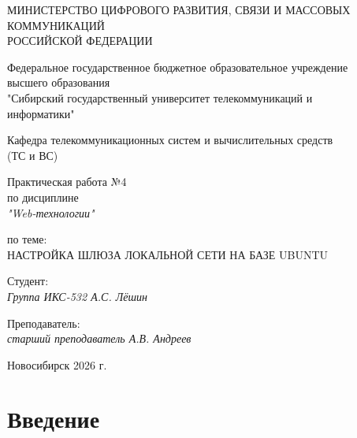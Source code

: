 \documentclass[a4paper,14pt,oneside,openany]{memoir}
\begin{document}
\thispagestyle{empty}

\begin{center}
    МИНИСТЕРСТВО ЦИФРОВОГО РАЗВИТИЯ, СВЯЗИ И МАССОВЫХ \\ КОММУНИКАЦИЙ \\ РОССИЙСКОЙ ФЕДЕРАЦИИ

    \vspace{20pt}

    Федеральное государственное бюджетное образовательное учреждение \\ высшего образования \\
    "Сибирский государственный университет телекоммуникаций и \\ информатики"

    \vspace{20pt}

    Кафедра телекоммуникационных систем и вычислительных средств \\ (ТС и ВС)
\end{center}

\vfill

\begin{center}
    Практическая работа №4 \\
    по дисциплине \\
    \textit{"Web-технологии"}

    \vspace{20pt}

    по теме: \\
    \uppercase{Настройка шлюза локальной сети на базе Ubuntu}
\end{center}

\vfill

\noindent Студент: \\
\textit{Группа ИКС-532 \hfill А.С. Лёшин}

\vspace{20pt}

\noindent Преподаватель: \\
\textit{старший преподаватель \hfill А.В. Андреев}

\vfill

\begin{center}
    Новосибирск 2026 г.
\end{center}

\newpage
\setcounter{page}{2}
\OnehalfSpacing*

\section*{Введение}
\end{document}
